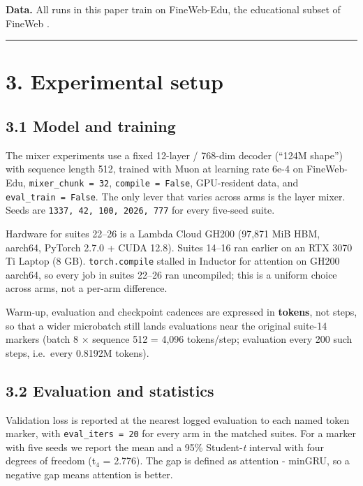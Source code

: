 \textbf{Data.} All runs in this paper train on FineWeb-Edu, the educational subset of FineWeb \cite{ref25}.

\begin{center}\rule{0.5\linewidth}{0.5pt}\end{center}

\section{3. Experimental setup}\label{experimental-setup}

\subsection{3.1 Model and training}\label{model-and-training}

The mixer experiments use a fixed 12-layer / 768-dim decoder (``124M shape'') with sequence length
512, trained with Muon at learning rate 6e-4 on FineWeb-Edu, \texttt{mixer\_chunk\ =\ 32}, \texttt{compile\ =\ False},
GPU-resident data, and \texttt{eval\_train\ =\ False}. The only lever that varies across arms is the layer
mixer. Seeds are \texttt{1337,\ 42,\ 100,\ 2026,\ 777} for every five-seed suite.

Hardware for suites 22--26 is a Lambda Cloud GH200 (97,871 MiB HBM, aarch64, PyTorch 2.7.0 +
CUDA 12.8). Suites 14--16 ran earlier on an RTX 3070 Ti Laptop (8 GB). \texttt{torch.compile} stalled in
Inductor for attention on GH200 aarch64, so every job in suites 22--26 ran uncompiled; this is a
uniform choice across arms, not a per-arm difference.

Warm-up, evaluation and checkpoint cadences are expressed in \textbf{tokens}, not steps, so that a
wider microbatch still lands evaluations near the original suite-14 markers (batch 8 $\times$ sequence
512 = 4,096 tokens/step; evaluation every 200 such steps, i.e.~every 0.8192M tokens).

\subsection{3.2 Evaluation and statistics}\label{evaluation-and-statistics}

Validation loss is reported at the nearest logged evaluation to each named token marker, with
\texttt{eval\_iters\ =\ 20} for every arm in the matched suites. For a marker with five seeds we report the
mean and a 95\% Student-\emph{t} interval with four degrees of freedom (t$_4$ = 2.776). The gap is defined
as attention - minGRU, so a negative gap means attention is better.

